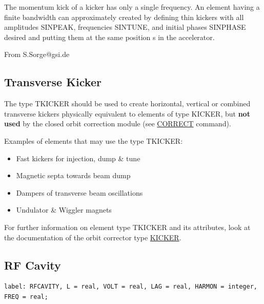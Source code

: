 The momentum kick of a kicker has only a single frequency. An element
having a finite bandwidth can approximately created by defining  thin
kickers with all amplitudes SINPEAK, frequencies SINTUNE, and  initial
phases SINPHASE desired and putting them at the same position s in  the
accelerator.   

From S.Sorge@gsi.de  


%
\subsection{Transverse Kicker}
The type TKICKER should be used to create horizontal, vertical or
combined transverse kickers physically equivalent to elements of type
KICKER, but \textbf{not used} by the closed orbit correction module (see
\href{../cororbit/co_correct.html}{CORRECT} command).   

Examples of elements that may use the type TKICKER: 
\begin{itemize}
   \item Fast kickers for injection, dump \& tune
   \item Magnetic septa towards beam dump
   \item Dampers of transverse beam oscillations
   \item Undulator \& Wiggler magnets
\end{itemize}

For further information on element type TKICKER and its attributes, look
at the documentation of the orbit corrector type
\href{kickers.html#kick}{KICKER}.   



%
\subsection{RF Cavity}
\label{sec:rf_cavity}

\begin{verbatim}
label: RFCAVITY, L = real, VOLT = real, LAG = real, HARMON = integer, FREQ = real;                  
\end{verbatim} 



